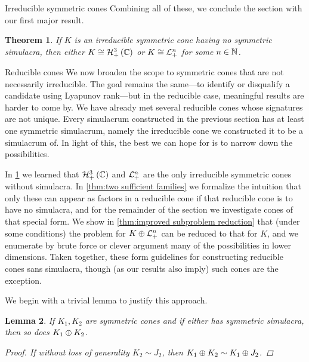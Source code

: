 \documentclass{interact}
\theoremstyle{plain}
\newtheorem{theorem}{Theorem}[section]
\newtheorem{lemma}[theorem]{Lemma}
\theoremstyle{definition}
\theoremstyle{remark}
\begin{document}
\begin{section}{Irreducible symmetric cones}
    Combining all of these, we conclude the section with our first
    major result.

    \begin{theorem}\label{thm:only irreducible factors}
      If $K$ is an irreducible symmetric cone having no symmetric
      simulacra, then either $K \cong \Hnplus[3]\of{\Cn[1]}$ or $K
      \cong \mathcal{L}^{{n}}_{+}$ for some $n \in \Nn[1]$.
    \end{theorem}
  \end{section}

  \begin{section}{Reducible cones}\label{sec:reducible cones}
    We now broaden the scope to symmetric cones that are not
    necessarily irreducible. The goal remains the same---to identify
    or disqualify a candidate using Lyapunov rank---but in the
    reducible case, meaningful results are harder to come by. We have
    already met several reducible cones whose signatures are not
    unique. Every simulacrum constructed in the previous section has
    at least one symmetric simulacrum, namely the irreducible cone we
    constructed it to be a simulacrum of. In light of this, the best
    we can hope for is to narrow down the possibilities.

    In \cref{thm:only irreducible factors} we learned that
    $\Hnplus[3]\of{\Cn[1]}$ and $\mathcal{L}^{{n}}_{+}$ are the only irreducible
    symmetric cones without simulacra. In \cref{thm:two sufficient
      families} we formalize the intuition that only these can appear
    as factors in a reducible cone if that reducible cone is to have
    no simulacra, and for the remainder of the section we investigate
    cones of that special form. We show in \cref{thm:improved
      subproblem reduction} that (under some conditions) the problem
    for ${K}\oplus{ \mathcal{L}^{{n}}_{+} }$ can be reduced to that for $K$, and
    we enumerate by brute force or clever argument many of the
    possibilities in lower dimensions. Taken together, these form
    guidelines for constructing reducible cones sans simulacra, though
    (as our results also imply) such cones are the exception.

    We begin with a trivial lemma to justify this approach.

    \begin{lemma}\label{lem:subcone simulacra}
      If $K_{1},K_{2}$ are symmetric cones and if either has symmetric
      simulacra, then so does ${K_{1}}\oplus{K_{2}}$.
      \begin{proof}
        If without loss of generality $K_{2} \sim J_{2}$, then
        ${K_{1}}\oplus{K_{2}} \sim {K_{1}}\oplus{J_{2}}$.
      \end{proof}
    \end{lemma}


\end{section}
\end{document}
